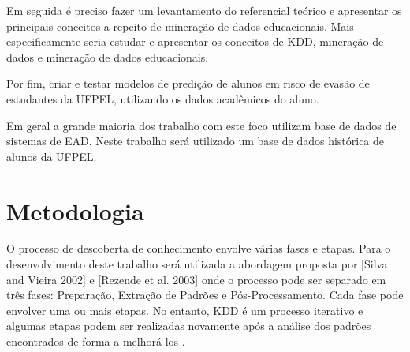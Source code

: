 \documentclass[diss-proposta,nocipinfo]{texufpel}
\begin{document}
Em seguida é preciso fazer um levantamento do referencial teórico e apresentar os principais conceitos a repeito de mineração de dados educacionais. Mais especificamente seria estudar e apresentar os conceitos de KDD, mineração de dados e mineração de dados educacionais.

Por fim, criar e testar modelos de predição de alunos em risco de evasão de estudantes da UFPEL, utilizando os dados acadêmicos do aluno.

Em geral a grande maioria dos trabalho com este foco utilizam base de dados de sistemas de EAD. Neste trabalho será utilizado um base de dados histórica de alunos da UFPEL.


\chapter{Metodologia}

O processo de descoberta de conhecimento envolve várias fases e etapas. Para o desenvolvimento deste trabalho será utilizada a abordagem proposta por [Silva and Vieira 2002] e [Rezende et al. 2003] onde o processo pode ser separado em três fases: Preparação, Extração de Padrões e Pós-Processamento. Cada fase pode envolver uma ou mais etapas. No entanto, KDD é um processo iterativo e algumas etapas podem ser realizadas novamente após a análise dos padrões encontrados de forma a melhorá-los \cite{Pimentel2006}.
\end{document}
